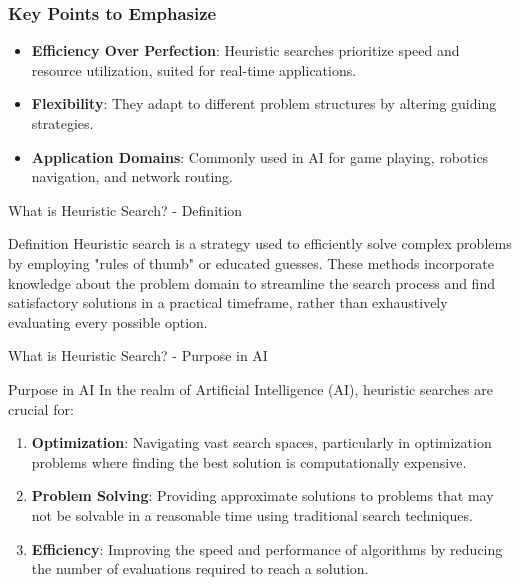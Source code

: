 \documentclass[aspectratio=169]{beamer}
\begin{document}
\begin{frame}[fragile]
    \frametitle{Key Points to Emphasize}
    \begin{itemize}
        \item \textbf{Efficiency Over Perfection}: Heuristic searches prioritize speed and resource utilization, suited for real-time applications.
        \item \textbf{Flexibility}: They adapt to different problem structures by altering guiding strategies.
        \item \textbf{Application Domains}: Commonly used in AI for game playing, robotics navigation, and network routing.
    \end{itemize}
\end{frame}

\begin{frame}[fragile]{What is Heuristic Search? - Definition}
    \begin{block}{Definition}
        Heuristic search is a strategy used to efficiently solve complex problems by employing "rules of thumb" or educated guesses. These methods incorporate knowledge about the problem domain to streamline the search process and find satisfactory solutions in a practical timeframe, rather than exhaustively evaluating every possible option.
    \end{block}
\end{frame}

\begin{frame}[fragile]{What is Heuristic Search? - Purpose in AI}
    \begin{block}{Purpose in AI}
        In the realm of Artificial Intelligence (AI), heuristic searches are crucial for:
        \begin{enumerate}
            \item \textbf{Optimization}: Navigating vast search spaces, particularly in optimization problems where finding the best solution is computationally expensive.
            \item \textbf{Problem Solving}: Providing approximate solutions to problems that may not be solvable in a reasonable time using traditional search techniques.
            \item \textbf{Efficiency}: Improving the speed and performance of algorithms by reducing the number of evaluations required to reach a solution.
        \end{enumerate}
    \end{block}
\end{frame}
\end{document}
